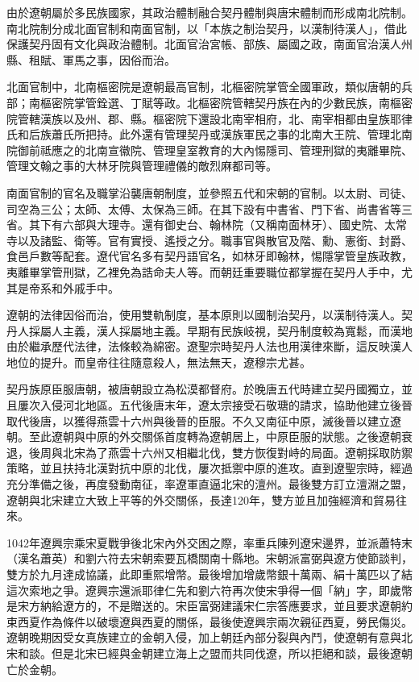 由於遼朝屬於多民族國家，其政治體制融合契丹體制與唐宋體制而形成南北院制。南北院制分成北面官制和南面官制，以「本族之制治契丹，以漢制待漢人」，借此保護契丹固有文化與政治體制。北面官治宮帳、部族、屬國之政，南面官治漢人州縣、租賦、軍馬之事，因俗而治。

北面官制中，北南樞密院是遼朝最高官制，北樞密院掌管全國軍政，類似唐朝的兵部；南樞密院掌管銓選、丁賦等政。北樞密院管轄契丹族在內的少數民族，南樞密院管轄漢族以及州、郡、縣。樞密院下還設北南宰相府，北、南宰相都由皇族耶律氏和后族蕭氏所把持。此外還有管理契丹或漢族軍民之事的北南大王院、管理北南院御前祗應之的北南宣徽院、管理皇室教育的大內惕隱司、管理刑獄的夷離畢院、管理文翰之事的大林牙院與管理禮儀的敵烈麻都司等。

南面官制的官名及職掌沿襲唐朝制度，並參照五代和宋朝的官制。以太尉、司徒、司空為三公；太師、太傅、太保為三師。在其下設有中書省、門下省、尚書省等三省。其下有六部與大理寺。還有御史台、翰林院（又稱南面林牙）、國史院、太常寺以及諸監、衛等。官有實授、遙授之分。職事官與散官及階、勳、憲銜、封爵、食邑戶數等配套。遼代官名多有契丹語官名，如林牙即翰林，惕隱掌管皇族政教，夷離畢掌管刑獄，乙裡免為誥命夫人等。而朝廷重要職位都掌握在契丹人手中，尤其是帝系和外戚手中。

遼朝的法律因俗而治，使用雙軌制度，基本原則以國制治契丹，以漢制待漢人。契丹人採屬人主義，漢人採屬地主義。早期有民族岐視，契丹制度較為寬鬆，而漢地由於繼承歷代法律，法條較為綿密。遼聖宗時契丹人法也用漢律來斷，這反映漢人地位的提升。而皇帝往往隨意殺人，無法無天，遼穆宗尤甚。

契丹族原臣服唐朝，被唐朝設立為松漠都督府。於晚唐五代時建立契丹國獨立，並且屢次入侵河北地區。五代後唐末年，遼太宗接受石敬瑭的請求，協助他建立後晉取代後唐，以獲得燕雲十六州與後晉的臣服。不久又南征中原，滅後晉以建立遼朝。至此遼朝與中原的外交關係首度轉為遼朝居上，中原臣服的狀態。之後遼朝衰退，後周與北宋為了燕雲十六州又相繼北伐，雙方恢復對峙的局面。遼朝採取防禦策略，並且扶持北漢對抗中原的北伐，屢次抵禦中原的進攻。直到遼聖宗時，經過充分準備之後，再度發動南征，率遼軍直逼北宋的澶州。最後雙方訂立澶淵之盟，遼朝與北宋建立大致上平等的外交關係，長達120年，雙方並且加強經濟和貿易往來。

1042年遼興宗乘宋夏戰爭後北宋內外交困之際，率重兵陳列遼宋邊界，並派蕭特末（漢名蕭英）和劉六符去宋朝索要瓦橋關南十縣地。宋朝派富弼與遼方使節談判，雙方於九月達成協議，此即重熙增幣。最後增加增歲幣銀十萬兩、絹十萬匹以了結這次索地之爭。遼興宗還派耶律仁先和劉六符再次使宋爭得一個「納」字，即歲幣是宋方納給遼方的，不是贈送的。宋臣富弼建議宋仁宗答應要求，並且要求遼朝約束西夏作為條件以破壞遼與西夏的關係，最後使遼興宗兩次親征西夏，勞民傷災。遼朝晚期因受女真族建立的金朝入侵，加上朝廷內部分裂與內鬥，使遼朝有意與北宋和談。但是北宋已經與金朝建立海上之盟而共同伐遼，所以拒絕和談，最後遼朝亡於金朝。

